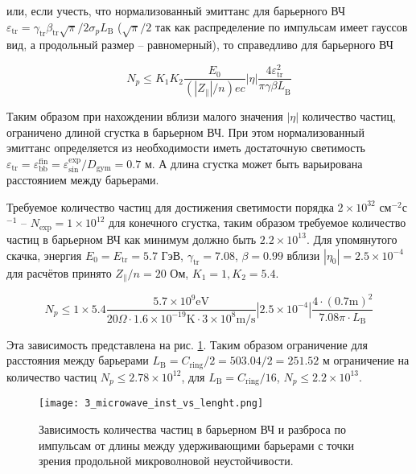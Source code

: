 \noindent или, если учесть, что нормализованный эмиттанс для барьерного ВЧ $\varepsilon_{\textrm{tr}}=\gamma_{\textrm{tr}}\beta_{\textrm{tr}}\sqrt{\pi}/2\sigma_p L_{\textrm{B}}$ ($\sqrt{\pi}/2$ так как распределение по импульсам имеет гауссов вид, а продольный размер -- равномерный), то справедливо для барьерного ВЧ

\begin{equation}
N_p\le K_1K_2\frac{E_0}{\left(\left|Z_\parallel\right|/n\right)ec}\left|\eta\right|\frac{4\varepsilon_{\text{tr}}^2}{{\pi\gamma\beta L}_{\textrm{B}}}
\label{eq:microwave_instability_2}
\end{equation}

\noindent Таким образом при нахождении вблизи малого значения $\left|\eta\right|$ количество частиц, ограничено длиной сгустка в барьерном ВЧ. При этом нормализованный эмиттанс определяется из необходимости иметь достаточную светимость $\varepsilon_{\textrm{tr}}=\varepsilon_{\textrm{bb}}^{\textrm{fin}}=\varepsilon_{\textrm{sin}}^{\textrm{exp}}/D_{\textrm{gym}}=0.7$ м. А длина сгустка может быть варьирована расстоянием между барьерами. 

\par Требуемое количество частиц для достижения светимости порядка $2\times10^{32}$ см$^{-2}$с$^{-1}$ – $N_{\textrm{exp}}=1\times10^{12}$ для конечного сгустка, таким образом требуемое количество частиц в барьерном ВЧ как минимум должно быть $2.2\times10^{13}$. Для упомянутого скачка, энергия $E_0=E_{\textrm{tr}}=5.7$ ГэВ, $\gamma_{\textrm{tr}}=7.08$, $\beta=0.99$ вблизи $\left|\eta_0\right|=2.5\times10^{-4}$ для расчётов принято $Z_\parallel/n=20$ Ом, $K_1=1, K_2=5.4$.

\begin{equation}
N_p\le1\times5.4\frac{5.7\times10^{9} \text{eV}}{20 \Omega \cdot 1.6\times10^{-19} \text{K} \cdot 3\times10^{8} \text{m/s}} |2.5\times10^{-4}|\frac{4\cdot(0.7 \text{m})^2}{7.08 \pi \cdot L_{\text{B}}}
\label{eq:microwave_instability_example}
\end{equation}

\noindent Эта зависимость представлена на рис. \ref{fig:3_microwave_inst_vs_lenght.png}. Таким образом ограничение для расстояния между барьерами $L_{\text{B}}=C_{\textrm{ring}}/2=503.04/2=251.52$ м ограничение на количество частиц $N_p\le2.78\times10^{12}$, для $L_{\textrm{B}}=C_{\textrm{ring}}/16$, $N_p\le2.2\times10^{13}$.

\begin{figure}
\centering
   \texttt{[image: 3\_microwave\_inst\_vs\_lenght.png]}
   \caption{Зависимость количества частиц в барьерном ВЧ и разброса по импульсам от длины между удерживающими барьерами с точки зрения продольной микроволновой неустойчивости.}
   \label{fig:3_microwave_inst_vs_lenght.png}
\end{figure}

